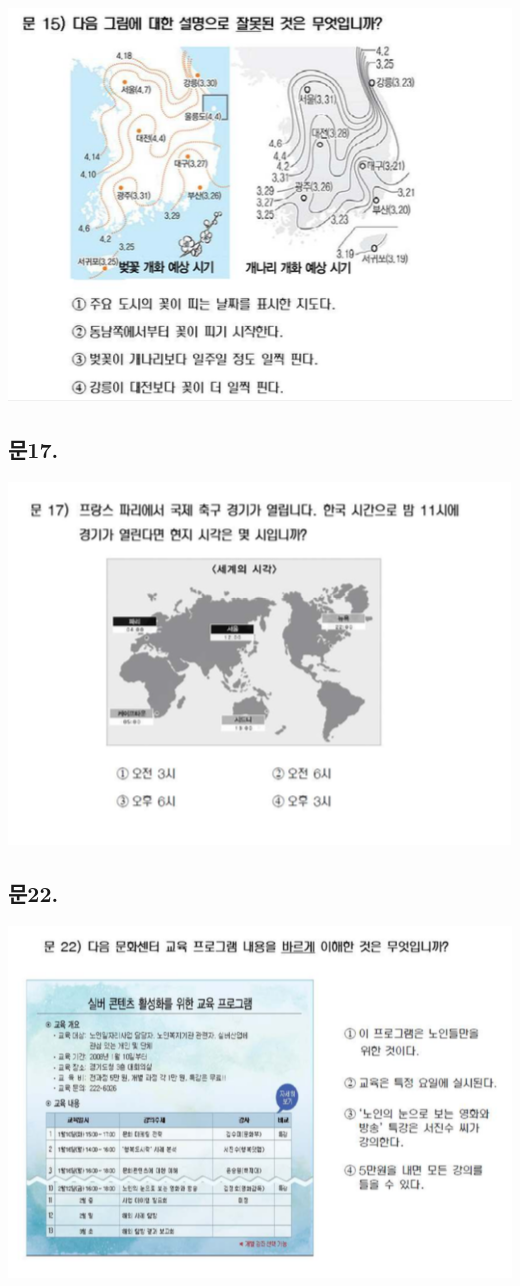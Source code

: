 \documentclass[
]{book}
\begin{document}
\begin{flushleft}\includegraphics[width=0.75\linewidth]{./pics/Q15} \end{flushleft}

\subsection{문17.}\label{uxbb3817.}

\begin{flushleft}\includegraphics[width=0.75\linewidth]{./pics/Q17} \end{flushleft}

\subsection{문22.}\label{uxbb3822.}

\begin{flushleft}\includegraphics[width=0.75\linewidth]{./pics/Q22} \end{flushleft}
\end{document}
